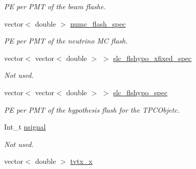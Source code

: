 \begin{DoxyCompactItemize}
\begin{DoxyCompactList}\small\item\em P\-E per P\-M\-T of the beam flashe. \end{DoxyCompactList}\item 
\hypertarget{classUBXSecEvent_aa51dba44fd0d9dcfbeb4c455b73debbd}{vector$<$ double $>$ \hyperlink{classUBXSecEvent_aa51dba44fd0d9dcfbeb4c455b73debbd}{numc\-\_\-flash\-\_\-spec}}\label{classUBXSecEvent_aa51dba44fd0d9dcfbeb4c455b73debbd}

\begin{DoxyCompactList}\small\item\em P\-E per P\-M\-T of the neutrino M\-C flash. \end{DoxyCompactList}\item 
\hypertarget{classUBXSecEvent_aff42f5975ca8b7c22f21023ffe8cf2c9}{vector$<$ vector$<$ double $>$ $>$ \hyperlink{classUBXSecEvent_aff42f5975ca8b7c22f21023ffe8cf2c9}{slc\-\_\-flshypo\-\_\-xfixed\-\_\-spec}}\label{classUBXSecEvent_aff42f5975ca8b7c22f21023ffe8cf2c9}

\begin{DoxyCompactList}\small\item\em Not used. \end{DoxyCompactList}\item 
\hypertarget{classUBXSecEvent_aa82aa9b73994eae31d0f7ab0f47f23fa}{vector$<$ vector$<$ double $>$ $>$ \hyperlink{classUBXSecEvent_aa82aa9b73994eae31d0f7ab0f47f23fa}{slc\-\_\-flshypo\-\_\-spec}}\label{classUBXSecEvent_aa82aa9b73994eae31d0f7ab0f47f23fa}

\begin{DoxyCompactList}\small\item\em P\-E per P\-M\-T of the hypothesis flash for the T\-P\-C\-Objetc. \end{DoxyCompactList}\item 
\hypertarget{classUBXSecEvent_a6aff7f0ac0e26d4b80b117cb5797f1ab}{Int\-\_\-t \hyperlink{classUBXSecEvent_a6aff7f0ac0e26d4b80b117cb5797f1ab}{nsignal}}\label{classUBXSecEvent_a6aff7f0ac0e26d4b80b117cb5797f1ab}

\begin{DoxyCompactList}\small\item\em Not used. \end{DoxyCompactList}\item 
\hypertarget{classUBXSecEvent_a75b4a2318b7f7f187acdc33622a4795e}{vector$<$ double $>$ \hyperlink{classUBXSecEvent_a75b4a2318b7f7f187acdc33622a4795e}{tvtx\-\_\-x}}\label{classUBXSecEvent_a75b4a2318b7f7f187acdc33622a4795e}


\end{DoxyCompactItemize}
